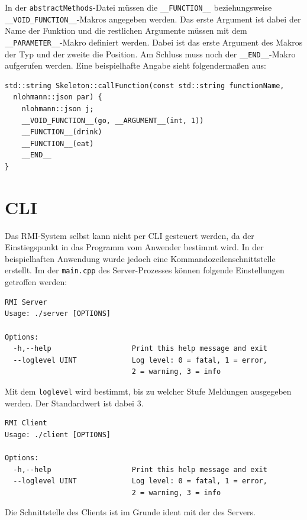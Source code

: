 \documentclass[a4paper,oneside,10pt]{report}
\begin{document}
In der \texttt{abstractMethods}-Datei müssen die \texttt{\_\_FUNCTION\_\_} beziehungsweise \texttt{\_\_VOID\_FUNCTION\_\_}-Makros angegeben werden. Das erste Argument ist dabei der Name der Funktion und die restlichen Argumente müssen mit dem \texttt{\_\_PARAMETER\_\_}-Makro definiert werden. Dabei ist das erste Argument des Makros der Typ und der zweite die Position. Am Schluss muss noch der \texttt{\_\_END\_\_}-Makro aufgerufen werden. Eine beispielhafte Angabe sieht folgendermaßen aus: 

\begin{lstlisting}
std::string Skeleton::callFunction(const std::string functionName, 
  nlohmann::json par) {
    nlohmann::json j;
    __VOID_FUNCTION__(go, __ARGUMENT__(int, 1))
    __FUNCTION__(drink)
    __FUNCTION__(eat)
    __END__
}
\end{lstlisting}

\section{CLI}

Das RMI-System selbst kann nicht per CLI gesteuert werden, da der Einstiegspunkt in das Programm vom Anwender bestimmt wird. In der beispielhaften Anwendung wurde jedoch eine Kommandozeilenschnittstelle erstellt. Im der \texttt{main.cpp} des Server-Prozesses können folgende Einstellungen getroffen werden: 
\begin{lstlisting}
RMI Server
Usage: ./server [OPTIONS]

Options:
  -h,--help                   Print this help message and exit
  --loglevel UINT             Log level: 0 = fatal, 1 = error,
                              2 = warning, 3 = info
\end{lstlisting}

Mit dem \texttt{loglevel} wird bestimmt, bis zu welcher Stufe Meldungen ausgegeben werden. Der Standardwert ist dabei 3. 

\begin{lstlisting}
RMI Client
Usage: ./client [OPTIONS]

Options:
  -h,--help                   Print this help message and exit
  --loglevel UINT             Log level: 0 = fatal, 1 = error,
                              2 = warning, 3 = info
\end{lstlisting}

Die Schnittstelle des Clients ist im Grunde ident mit der des Servers. 

\end{document}
